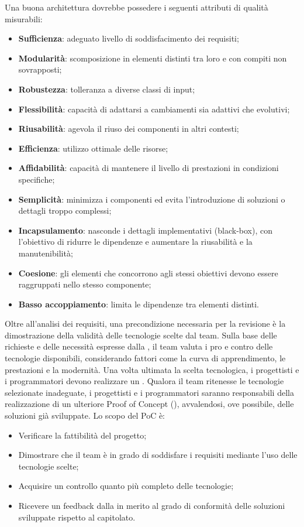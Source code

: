 \par Una buona architettura dovrebbe possedere i seguenti attributi di qualità misurabili:
\begin{itemize}
  \item \textbf{Sufficienza}: adeguato livello di soddisfacimento dei requisiti;
  \item \textbf{Modularità}: scomposizione in elementi distinti tra loro e con compiti non sovrapposti;
  \item \textbf{Robustezza}: tolleranza a diverse classi di input;
  \item \textbf{Flessibilità}: capacità di adattarsi a cambiamenti sia adattivi che evolutivi;
  \item \textbf{Riusabilità}: agevola il riuso dei componenti in altri contesti;
  \item \textbf{Efficienza}: utilizzo ottimale delle risorse;
  \item \textbf{Affidabilità}: capacità di mantenere il livello di prestazioni in condizioni specifiche;
  \item \textbf{Semplicità}: minimizza i componenti ed evita l'introduzione di soluzioni o dettagli troppo complessi;
  \item \textbf{Incapsulamento}: nasconde i dettagli implementativi (black-box), con l'obiettivo di ridurre le dipendenze e aumentare la riusabilità e la manutenibilità;
  \item \textbf{Coesione}: gli elementi che concorrono agli stessi obiettivi devono essere raggruppati nello stesso componente;
  \item \textbf{Basso accoppiamento}: limita le dipendenze tra elementi distinti.
\end{itemize}

\label{poc}
Oltre all’analisi dei requisiti, una precondizione necessaria per la revisione  è la dimostrazione della validità delle tecnologie scelte dal team. Sulla base delle richieste e delle necessità espresse dalla , il team valuta i pro e contro delle tecnologie disponibili, considerando fattori come la curva di apprendimento, le prestazioni e la modernità. Una volta ultimata la scelta tecnologica, i progettisti e i programmatori devono realizzare un . Qualora il team ritenesse le tecnologie selezionate inadeguate, i progettisti e i programmatori saranno responsabili della realizzazione di un ulteriore Proof of Concept (), avvalendosi, ove possibile, delle soluzioni già sviluppate. Lo scopo del PoC è:
\begin{itemize}
  \item Verificare la fattibilità del progetto;
  \item Dimostrare che il team è in grado di soddisfare i requisiti mediante l'uso delle tecnologie scelte;
  \item Acquisire un controllo quanto più completo delle tecnologie;
  \item Ricevere un feedback dalla  in merito al grado di conformità delle soluzioni sviluppate rispetto al capitolato.
\end{itemize}

